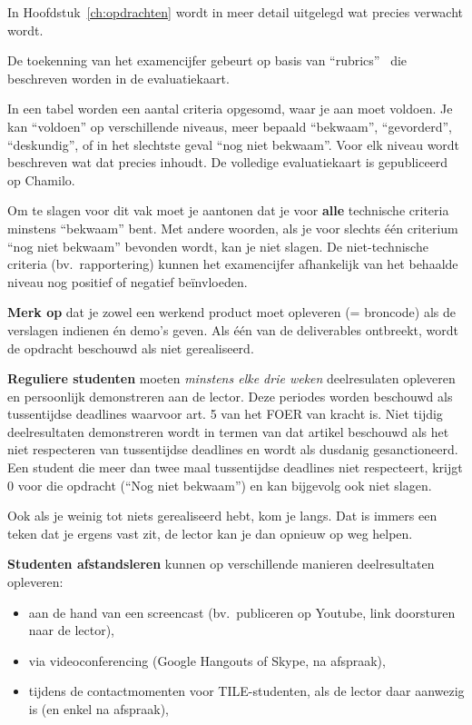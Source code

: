 In Hoofdstuk~\ref{ch:opdrachten} wordt in meer detail uitgelegd wat precies verwacht wordt.

De toekenning van het examencijfer gebeurt op basis van ``rubrics''~\autocite{Andrade2000} die beschreven worden in de evaluatiekaart.

In een tabel worden een aantal criteria opgesomd, waar je aan moet voldoen. Je kan ``voldoen'' op verschillende niveaus, meer bepaald ``bekwaam'', ``gevorderd'', ``deskundig'', of in het slechtste geval ``nog niet bekwaam''. Voor elk niveau wordt beschreven wat dat precies inhoudt. De volledige evaluatiekaart is gepubliceerd op Chamilo.

Om te slagen voor dit vak moet je aantonen dat je voor \textbf{alle} technische criteria minstens ``bekwaam'' bent. Met andere woorden, als je voor slechts één criterium ``nog niet bekwaam'' bevonden wordt, kan je niet slagen. De niet-technische criteria (bv.\ rapportering) kunnen het examencijfer afhankelijk van het behaalde niveau nog positief of negatief beïnvloeden.

\textbf{Merk op} dat je zowel een werkend product moet opleveren (= broncode) als de verslagen indienen én demo's geven. Als één van de deliverables ontbreekt, wordt de opdracht beschouwd als niet gerealiseerd.

\textbf{Reguliere studenten} moeten \emph{minstens elke drie weken} deelresulaten opleveren en persoonlijk demonstreren aan de lector. Deze periodes worden beschouwd als tussentijdse deadlines waarvoor art. 5 van het FOER van kracht is. Niet tijdig deelresultaten demonstreren wordt in termen van dat artikel beschouwd als het niet respecteren van tussentijdse deadlines en wordt als dusdanig gesanctioneerd. Een student die meer dan twee maal tussentijdse deadlines niet respecteert, krijgt 0 voor die opdracht (``Nog niet bekwaam'') en kan bijgevolg ook niet slagen.

Ook als je weinig tot niets gerealiseerd hebt, kom je langs. Dat is immers een teken dat je ergens vast zit, de lector kan je dan opnieuw op weg helpen.

\textbf{Studenten afstandsleren} kunnen op verschillende manieren deelresultaten opleveren:

\begin{itemize}
  \item aan de hand van een screencast (bv.\ publiceren op Youtube, link doorsturen naar de lector),
  \item via videoconferencing (Google Hangouts of Skype, na afspraak),
  \item tijdens de contactmomenten voor TILE-studenten, als de lector daar aanwezig is (en enkel na afspraak),
\end{itemize}

